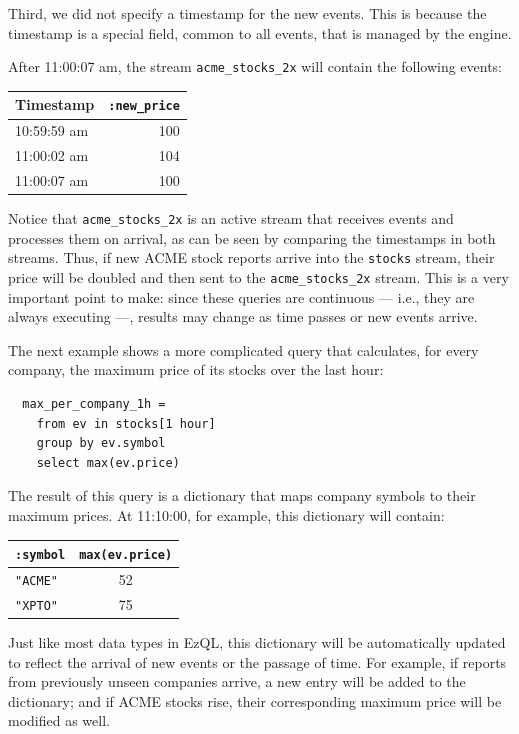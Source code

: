\documentclass{report}
\begin{document}
Third, we did not specify a timestamp for the new events. This is
because the timestamp is a special field, common to all events, that
is managed by the engine.

After 11:00:07 am, the stream \verb=acme_stocks_2x= will contain the
following events:

\begin{tabular}{ |l|r| }
  \hline
  Timestamp & \verb=:new_price= \\
  \hline
  10:59:59 am & 100 \\
  11:00:02 am & 104 \\
  11:00:07 am & 100 \\
  \hline
\end{tabular}

Notice that \verb=acme_stocks_2x= is an active stream that receives
events and processes them on arrival, as can be seen by comparing the
timestamps in both streams. Thus, if new ACME stock reports arrive
into the \verb=stocks= stream, their price will be doubled and then
sent to the \verb=acme_stocks_2x= stream. This is a very important
point to make: since these queries are continuous --- i.e., they are
always executing ---, results may change as time passes or new events
arrive.

The next example shows a more complicated query that calculates, for
every company, the maximum price of its stocks over the last hour:

\begin{lstlisting}
  max_per_company_1h =
    from ev in stocks[1 hour]
    group by ev.symbol
    select max(ev.price)
\end{lstlisting}

The result of this query is a dictionary that maps company symbols to
their maximum prices. At 11:10:00, for example, this dictionary will
contain:

\begin{tabular}{ |l|c| }
  \hline
  \verb=:symbol= & \verb=max(ev.price)= \\
  \hline
  \verb="ACME"= & 52 \\
  \verb="XPTO"= & 75 \\
  \hline
\end{tabular}

Just like most data types in EzQL, this dictionary will be
automatically updated to reflect the arrival of new events or the
passage of time. For example, if reports from previously unseen
companies arrive, a new entry will be added to the dictionary; and if
ACME stocks rise, their corresponding maximum price will be modified
as well.
\end{document}
